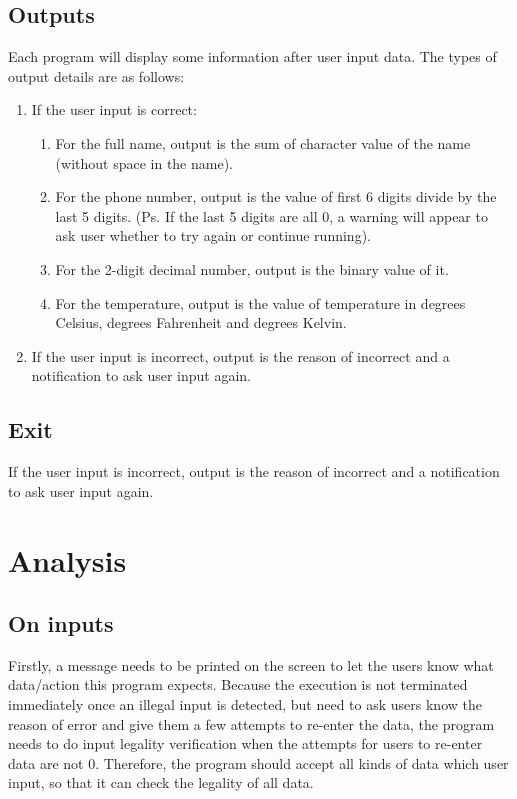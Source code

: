 \documentclass[12pt]{article}
\begin{document}
	\subsection{Outputs}
	Each program will display some information after user input data. The types of output details are as follows:
	
	\begin{enumerate}
	\item If the user input is correct:
	
		\begin{enumerate}
		\item For the full name, output is the sum of character value of the name (without space in the name).
		\item For the phone number, output is the value of first 6 digits divide by the last 5 digits.
		(Ps. If the last 5 digits are all 0, a warning will appear to ask user whether to try again or continue running).
		\item For the 2-digit decimal number, output is the binary value of it.
		\item For the temperature, output is the value of temperature in degrees Celsius, degrees Fahrenheit and degrees Kelvin.
		\end{enumerate}
	
	\item If the user input is incorrect, output is the reason of incorrect and a notification to ask user input again.
	\end{enumerate}
	
	\subsection{Exit}
	If the user input is incorrect, output is the reason of incorrect and a notification to ask user input again.

	\section{Analysis}
	
	\subsection{On inputs}
	Firstly, a message needs to be printed on the screen to let the users know what data/action this program expects. Because the execution is not terminated immediately once an illegal input is detected, but need to ask users know the reason of error and give them a few attempts to re-enter the data, the program needs to do input legality verification when the attempts for users to re-enter data are not 0. Therefore, the program should accept all kinds of data which user input, so that it can check the legality of all data.
	
\end{document}
